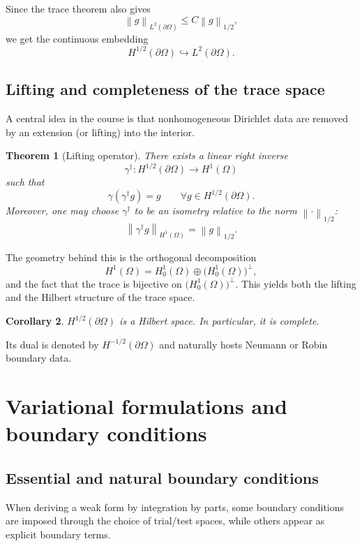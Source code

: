 \documentclass[11pt]{article}
\newtheorem{theorem}{Theorem}[section]
\newtheorem{corollary}[theorem]{Corollary}
\theoremstyle{definition}
\newcommand{\norm}[1]{\left\lVert #1\right\rVert}
\begin{document}
Since the trace theorem also gives
\[
\norm{g}_{L^2(\partial\Omega)} \le C\norm{g}_{1/2},
\]
we get the continuous embedding
\[
H^{1/2}(\partial\Omega) \hookrightarrow L^2(\partial\Omega).
\]

\subsection{Lifting and completeness of the trace space}

A central idea in the course is that nonhomogeneous Dirichlet data are removed by an extension (or lifting) into the interior.

\begin{theorem}[Lifting operator]
There exists a linear right inverse
\[
\gamma^\dagger:H^{1/2}(\partial\Omega)\to H^1(\Omega)
\]
such that
\[
\gamma(\gamma^\dagger g)=g \qquad \forall g\in H^{1/2}(\partial\Omega).
\]
Moreover, one may choose $\gamma^\dagger$ to be an isometry relative to the norm $\norm{\cdot}_{1/2}$:
\[
\norm{\gamma^\dagger g}_{H^1(\Omega)} = \norm{g}_{1/2}.
\]
\end{theorem}

The geometry behind this is the orthogonal decomposition
\[
H^1(\Omega)=H_0^1(\Omega)\oplus \big(H_0^1(\Omega)\big)^\perp,
\]
and the fact that the trace is bijective on $\big(H_0^1(\Omega)\big)^\perp$. This yields both the lifting and the Hilbert structure of the trace space.

\begin{corollary}
$H^{1/2}(\partial\Omega)$ is a Hilbert space. In particular, it is complete.
\end{corollary}

Its dual is denoted by $H^{-1/2}(\partial\Omega)$ and naturally hosts Neumann or Robin boundary data.

\section{Variational formulations and boundary conditions}

\subsection{Essential and natural boundary conditions}

When deriving a weak form by integration by parts, some boundary conditions are imposed through the choice of trial/test spaces, while others appear as explicit boundary terms.
\end{document}
